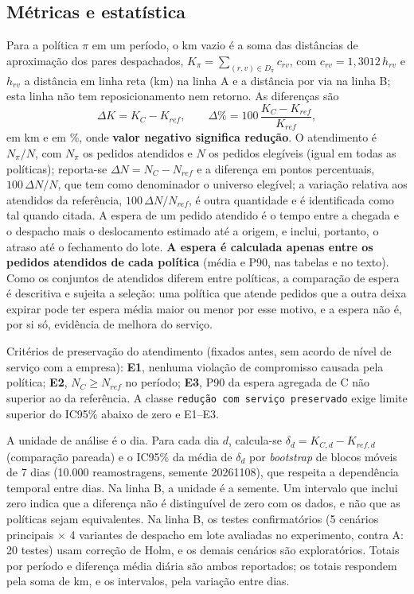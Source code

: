 \subsection{Métricas e estatística}

Para a política $\pi$ em um período, o km vazio é a soma das distâncias de aproximação dos pares despachados, $K_\pi=\sum_{(r,v)\in D_\pi} c_{rv}$, com $c_{rv}=1{,}3012\,h_{rv}$ e $h_{rv}$ a distância em linha reta (km) na linha A e a distância por via na linha B; esta linha não tem reposicionamento nem retorno. As diferenças são
\begin{equation}
\Delta K = K_C - K_{ref}, \qquad \Delta\% = 100\,\frac{K_C-K_{ref}}{K_{ref}}, \label{eq:delta}
\end{equation}
em km e em \%, onde \textbf{valor negativo significa redução}. O atendimento é $N_\pi/N$, com $N_\pi$ os pedidos atendidos e $N$ os pedidos elegíveis (igual em todas as políticas); reporta-se $\Delta N=N_C-N_{ref}$ e a diferença em pontos percentuais, $100\,\Delta N/N$, que tem como denominador o universo elegível; a variação relativa aos atendidos da referência, $100\,\Delta N/N_{ref}$, é outra quantidade e é identificada como tal quando citada. A espera de um pedido atendido é o tempo entre a chegada e o despacho mais o deslocamento estimado até a origem, e inclui, portanto, o atraso até o fechamento do lote. \textbf{A espera é calculada apenas entre os pedidos atendidos de cada política} (média e P90, nas tabelas e no texto). Como os conjuntos de atendidos diferem entre políticas, a comparação de espera é descritiva e sujeita a seleção: uma política que atende pedidos que a outra deixa expirar pode ter espera média maior ou menor por esse motivo, e a espera não é, por si só, evidência de melhora do serviço.

Critérios de preservação do atendimento (fixados antes, sem acordo de nível de serviço com a empresa): \textbf{E1}, nenhuma violação de compromisso causada pela política; \textbf{E2}, $N_C\ge N_{ref}$ no período; \textbf{E3}, P90 da espera agregada de C não superior ao da referência. A classe \texttt{redução com serviço preservado} exige limite superior do IC95\% abaixo de zero e E1--E3.

A unidade de análise é o dia. Para cada dia $d$, calcula-se $\delta_d=K_{C,d}-K_{ref,d}$ (comparação pareada) e o IC95\% da média de $\delta_d$ por \textit{bootstrap} de blocos móveis de 7 dias (10.000 reamostragens, semente 20261108), que respeita a dependência temporal entre dias. Na linha B, a unidade é a semente. Um intervalo que inclui zero indica que a diferença não é distinguível de zero com os dados, e não que as políticas sejam equivalentes. Na linha B, os testes confirmatórios (5 cenários principais $\times$ 4 variantes de despacho em lote avaliadas no experimento, contra A: 20 testes) usam correção de Holm, e os demais cenários são exploratórios. Totais por período e diferença média diária são ambos reportados; os totais respondem pela soma de km, e os intervalos, pela variação entre dias.
